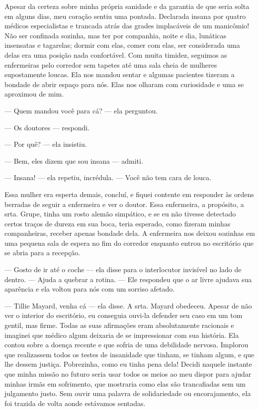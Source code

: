 Apesar
da certeza sobre minha própria sanidade e da garantia de que seria solta
em alguns dias, meu coração sentiu uma pontada. Declarada insana por
quatro médicos especialistas e trancada atrás das grades implacáveis de
um manicômio! Não ser confinada sozinha, mas ter por companhia, noite e
dia, lunáticas insensatas e tagarelas; dormir com elas, comer com elas,
ser considerada uma delas era uma posição nada confortável. Com muita
timidez, seguimos as enfermeiras pelo corredor sem tapetes até uma sala
cheia de mulheres supostamente loucas. Ela nos mandou sentar e algumas
pacientes tizeram a bondade de abrir espaço para nós. Elas nos olharam
com curiosidade e uma se aproximou de mim.

--- Quem mandou você para cá? --- ela perguntou.

--- Os doutores --- respondi.

--- Por quê? --- ela insistiu.

--- Bem, eles dizem que sou insana --- admiti.

--- Insana! --- ela repetiu, incrédula. --- Você não tem cara de louca.

Essa mulher era esperta demais, concluí, e fiquei contente em responder
às ordens berradas de seguir a enfermeira e ver o doutor. Essa
enfermeira, a propósito, a srta. Grupe, tinha um rosto alemão simpático,
e se eu não tivesse detectado certos traços de dureza em sua boca, teria
esperado, como fizeram minhas companheiras, receber apenas bondade dela.
A enfermeira nos deixou sozinhas em uma pequena sala de espera no fim do
corredor enquanto entrou no escritório que se abria para a recepção.

--- Gosto de ir até o coche --- ela disse para o interlocutor invisível
no lado de dentro. --- Ajuda a quebrar a rotina. --- Ele respondeu que o
ar livre ajudava sua aparência e ela voltou para nós com um sorriso
afetado.

---
Tillie Mayard, venha cá --- ela disse. A srta. Mayard obedeceu. Apesar
de não ver o interior do escritório, eu conseguia ouvi-la defender seu
caso em um tom gentil, mas firme. Todas as suas afirmações eram
absolutamente racionais e imaginei que médico algum deixaria de se
impressionar com sua história. Ela contou sobre a doença recente e que
sofria de uma debilidade nervosa. Implorou que realizassem todos os
testes de insanidade que tinham, se tinham algum, e que lhe dessem
justiça. Pobrezinha, como eu tinha pena dela! Decidi naquele instante
que minha missão no futuro seria usar todos os meios ao meu dispor para
ajudar minhas irmãs em sofrimento, que mostraria como elas são
trancafiadas sem um julgamento justo. Sem ouvir uma palavra de
solidariedade ou encorajamento, ela foi trazida de volta aonde estávamos
sentadas.


